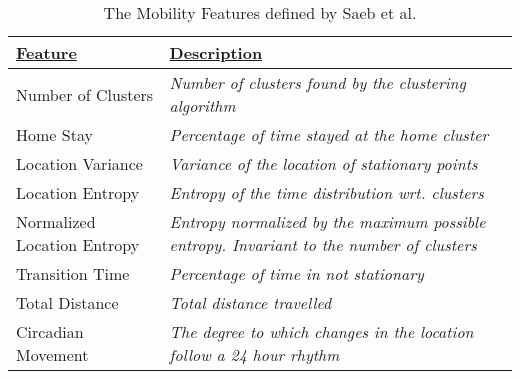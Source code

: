 \begin{table}[h]
    \centering
\begin{tabular}{|p{}|p{}|}
\hline
{\ul \textbf{Feature}}      & {\ul \textbf{Description}}                                                                                                                     \\ \hline
Number of Clusters          & \textit{Number of clusters found by the clustering algorithm}                                       \\ \hline
Home Stay                   & \textit{Percentage of time stayed at the home cluster}                                              \\ \hline
Location Variance           & \textit{Variance of the location of stationary points}                                              \\ \hline
Location Entropy            & \textit{Entropy of the time distribution wrt. clusters}                                             \\ \hline
Normalized Location Entropy & \textit{Entropy normalized by the maximum possible entropy. Invariant to the number of clusters} \\ \hline
Transition Time             & \textit{Percentage of time in not stationary}                                                                                                  \\ \hline
Total Distance              & \textit{Total distance travelled}                                                                                                              \\ \hline
Circadian Movement          & \textit{The degree to which changes in the location follow a 24 hour rhythm}                        \\ \hline
\end{tabular}
    \caption{The Mobility Features defined by Saeb et al. \cite{Saeb2015}}
    \label{tab:saeb-features}
\end{table}



